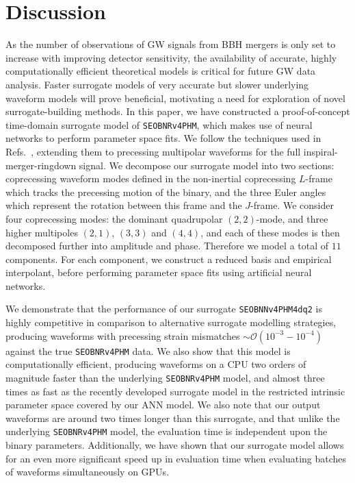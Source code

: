 \documentclass[prd,amssymb,amsmath,amsfonts,superscriptaddress,nofootinbib,reprint,showpacs, longbibliography]{revtex4-1}
\newcommand{\SEOB}{\texttt{SEOBNRv4PHM}}
\newcommand{\SEOBNN}{\texttt{SEOBNN\textunderscore v4PHM\textunderscore4dq2}}
\begin{document}
\section{Discussion}
\label{sec:Discussion}
As the number of observations of GW signals from BBH mergers is only set to increase with improving detector sensitivity, the availability of accurate, highly computationally efficient theoretical models is critical for future GW data analysis. Faster surrogate models of very accurate but slower underlying waveform models will prove beneficial, motivating a need for exploration of novel surrogate-building methods. In this paper, we have constructed a proof-of-concept time-domain surrogate model of \SEOB{}, which makes use of neural networks to perform parameter space fits. We follow the techniques used in Refs.~\cite{Chua:2019wwt, Khan:2020fso}, extending them to precessing multipolar waveforms for the full inspiral-merger-ringdown signal. We decompose our surrogate model into two sections: coprecessing waveform modes defined in the non-inertial coprecessing $L$-frame which tracks the precessing motion of the binary, and the three Euler angles which represent the rotation between this frame and the $J$-frame. We consider four coprecessing modes: the dominant quadrupolar $(2,2)$-mode, and three higher multipoles $(2,1)$, $(3,3)$ and $(4,4)$, and each of these modes is then decomposed further into amplitude and phase. Therefore we model a total of $11$ components. For each component, we construct a reduced basis and empirical interpolant, before performing parameter space fits using artificial neural networks.

We demonstrate that the performance of our surrogate \SEOBNN{} is highly competitive in comparison to alternative surrogate modelling strategies, producing waveforms with precessing strain mismatches $\sim \mathcal{O}\left(10^{-3} - 10^{-4}\right)$ against the true \SEOB{} data. We also show that this model is computationally efficient, producing waveforms on a CPU two orders of magnitude faster than the underlying \SEOB{} model, and almost three times as fast as the recently developed surrogate model \cite{Gadre:2022sed} in the restricted intrinsic parameter space covered by our ANN model. We also note that our output waveforms are around two times longer than this surrogate, and that unlike the underlying \SEOB{} model, the evaluation time is independent upon the binary parameters. Additionally, we have shown that our surrogate model allows for an even more significant speed up in evaluation time when evaluating batches of waveforms simultaneously on GPUs. 
\end{document}
